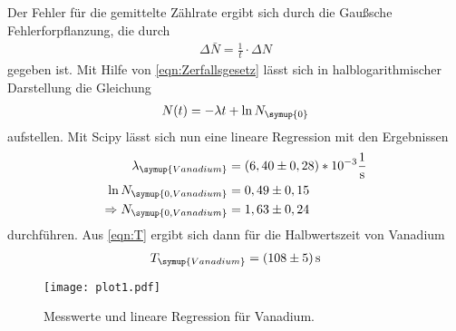 Der Fehler für die gemittelte Zählrate ergibt sich durch die Gaußsche Fehlerforpflanzung, die durch
\begin{align*}
  \Delta\bar{N} = \frac{1}{t}\cdot\Delta N
\end{align*}
gegeben ist. Mit Hilfe von \autoref{eqn:Zerfallsgesetz} lässt sich in halblogarithmischer Darstellung die
Gleichung
\begin{align*}
  N(t) = -\lambda t + \ln{N_{\symup{0}}}
\end{align*}
aufstellen. Mit Scipy lässt sich nun eine lineare Regression mit den Ergebnissen
\begin{align*}
  \lambda_{\symup{Vanadium}} &= (6,40 \pm 0,28)*10^{-3} \frac{1}{\unit{\second}} \\
  \ln{N_{\symup{0, Vanadium}}} &= 0,49 \pm 0,15 \\
  \Rightarrow N_{\symup{0, Vanadium}} &= 1,63 \pm 0,24 \\
\end{align*}
durchführen. Aus \autoref{eqn:T} ergibt sich dann für die Halbwertszeit von Vanadium
\begin{align*}
  T_{\symup{Vanadium}} = (108 \pm 5)\,\unit{\second}
\end{align*}

\begin{figure}
  \centering
  \texttt{[image: plot1.pdf]}
  \caption{Messwerte und lineare Regression für Vanadium.}
  \label{fig:vanadium}
\end{figure}

